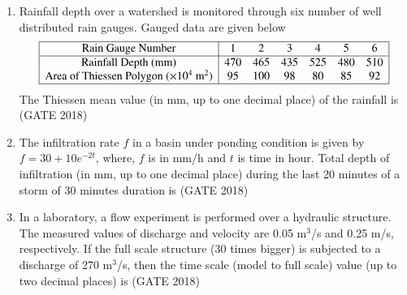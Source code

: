 \documentclass[journal,12pt,onecolumn]{IEEEtran}
\theoremstyle{remark}
\begin{document}
\begin{enumerate}
\item Rainfall depth over a watershed is monitored through six number of well distributed rain gauges. Gauged data are given below
\[
\begin{array}{|c|cccccc|}
\hline
\text{Rain Gauge Number} & 1 & 2 & 3 & 4 & 5 & 6 \\
\hline
\text{Rainfall Depth (mm)} & 470 & 465 & 435 & 525 & 480 & 510 \\
\text{Area of Thiessen Polygon ($\times 10^4$ m$^2$)} & 95 & 100 & 98 & 80 & 85 & 92 \\
\hline
\end{array}
\]
The Thiessen mean value (in mm, up to one decimal place) of the rainfall is \underline{\hspace{3cm}}
\hfill{(GATE 2018)}
\vspace{1cm}

\item The infiltration rate $f$ in a basin under ponding condition is given by $f = 30 + 10e^{-2t}$, where, $f$ is in mm/h and $t$ is time in hour. Total depth of infiltration (in mm, up to one decimal place) during the last 20 minutes of a storm of 30 minutes duration is \underline{\hspace{3cm}}
\hfill{(GATE 2018)}
\vspace{1cm}

\item In a laboratory, a flow experiment is performed over a hydraulic structure. The measured values of discharge and velocity are 0.05 m$^3$/s and 0.25 m/s, respectively. If the full scale structure (30 times bigger) is subjected to a discharge of 270 m$^3$/s, then the time scale (model to full scale) value (up to two decimal places) is \underline{\hspace{3cm}}
\hfill{(GATE 2018)}
\vspace{1cm}


\end{enumerate}
\end{document}
